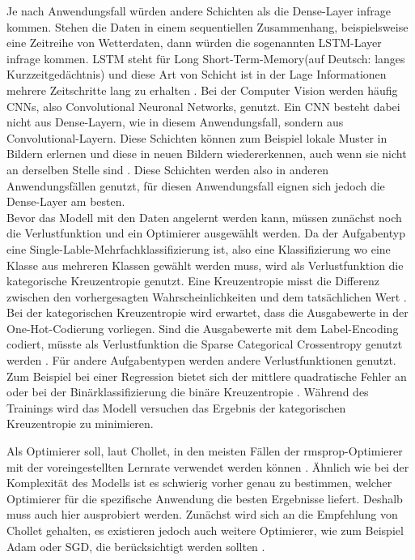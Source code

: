 Je nach Anwendungsfall würden andere Schichten als die Dense-Layer infrage kommen. Stehen die Daten in einem sequentiellen Zusammenhang, beispielsweise eine Zeitreihe von Wetterdaten, dann würden
die sogenannten LSTM-Layer infrage kommen. LSTM steht für Long Short-Term-Memory(auf Deutsch: langes Kurzzeitgedächtnis) und diese Art von Schicht ist in der Lage Informationen mehrere Zeitschritte
lang zu erhalten \cite[vgl. S.260]{DL_PY}. Bei der Computer Vision werden häufig CNNs, also Convolutional Neuronal Networks, genutzt. Ein CNN besteht dabei nicht aus Dense-Layern, wie in diesem 
Anwendungsfall, sondern aus Convolutional-Layern. Diese Schichten können zum Beispiel lokale Muster in Bildern erlernen und diese in neuen Bildern wiedererkennen, auch wenn sie nicht an derselben Stelle
sind \cite[vgl. S.164]{DL_PY}. Diese Schichten werden also in anderen Anwendungsfällen genutzt, für diesen Anwendungsfall eignen sich jedoch die Dense-Layer am besten.    \\

Bevor das Modell mit den Daten angelernt werden kann, müssen zunächst noch die Verlustfunktion und ein Optimierer ausgewählt werden. Da der Aufgabentyp eine Single-Lable-Mehrfachklassifizierung 
ist, also eine Klassifizierung wo eine Klasse aus mehreren Klassen gewählt werden muss, wird als Verlustfunktion die kategorische Kreuzentropie genutzt. 
Eine Kreuzentropie misst die Differenz zwischen den vorhergesagten Wahrscheinlichkeiten und dem tatsächlichen Wert \cite[vgl. S.102]{DL_PY}.
Bei der kategorischen Kreuzentropie wird erwartet, dass die Ausgabewerte in der One-Hot-Codierung vorliegen. Sind die Ausgabewerte mit dem Label-Encoding codiert,
müsste als Verlustfunktion die \glqq Sparse Categorical Crossentropy\grqq{} genutzt werden \cite{KerasDoc}. Für andere Aufgabentypen werden andere 
Verlustfunktionen genutzt. Zum Beispiel bei einer Regression bietet sich der mittlere quadratische Fehler an oder bei der Binärklassifizierung die binäre Kreuzentropie \cite[vgl. S.155]{DL_PY}.
Während des Trainings wird das Modell versuchen das Ergebnis der kategorischen Kreuzentropie zu minimieren. 

Als Optimierer soll, laut Chollet, in den meisten Fällen der \glqq rmsprop\grqq{}-Optimierer mit der voreingestellten Lernrate verwendet werden können \cite[vgl. S.155]{DL_PY}. Ähnlich wie bei 
der Komplexität des Modells ist es schwierig vorher genau zu bestimmen, welcher Optimierer für die spezifische Anwendung die besten Ergebnisse liefert. Deshalb muss auch hier ausprobiert werden.
Zunächst wird sich an die Empfehlung von Chollet gehalten, es existieren jedoch auch weitere Optimierer, wie zum Beispiel \glqq Adam\grqq{} oder \glqq SGD\grqq{}, die berücksichtigt 
werden sollten \cite{KerasDoc}. 

